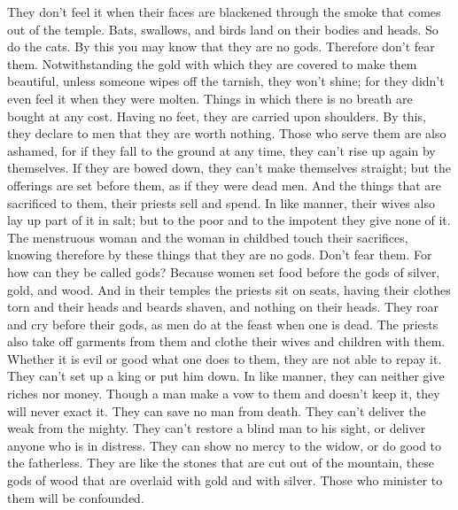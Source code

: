 They don't feel it  when their faces are blackened through
the smoke that comes out of the temple.  Bats, swallows,
and birds land on their bodies and heads. So do the cats. 
By this you may know that they are no gods. Therefore don't fear them.
 Notwithstanding the gold with which they are covered to
make them beautiful, unless someone wipes off the tarnish, they won't
shine; for they didn't even feel it when they were molten. 
Things in which there is no breath are bought at any cost. 
Having no feet, they are carried upon shoulders. By this, they declare
to men that they are worth nothing.  Those who serve them
are also ashamed, for if they fall to the ground at any time, they can't
rise up again by themselves. If they are bowed down, they can't make
themselves straight; but the offerings are set before them, as if they
were dead men.  And the things that are sacrificed to them,
their priests sell and spend. In like manner, their wives also lay up
part of it in salt; but to the poor and to the impotent they give none
of it.  The menstruous woman and the woman in childbed
touch their sacrifices, knowing therefore by these things that they are
no gods. Don't fear them.  For how can they be called gods?
Because women set food before the gods of silver, gold, and wood.
 And in their temples the priests sit on seats, having
their clothes torn and their heads and beards shaven, and nothing on
their heads.  They roar and cry before their gods, as men
do at the feast when one is dead.  The priests also take
off garments from them and clothe their wives and children with them.
 Whether it is evil or good what one does to them, they are
not able to repay it. They can't set up a king or put him down.
 In like manner, they can neither give riches nor money.
Though a man make a vow to them and doesn't keep it, they will never
exact it.  They can save no man from death. They can't
deliver the weak from the mighty.  They can't restore a
blind man to his sight, or deliver anyone who is in distress.
 They can show no mercy to the widow, or do good to the
fatherless.  They are like the stones that are cut out of
the mountain, these gods of wood that are overlaid with gold and with
silver. Those who minister to them will be confounded.


